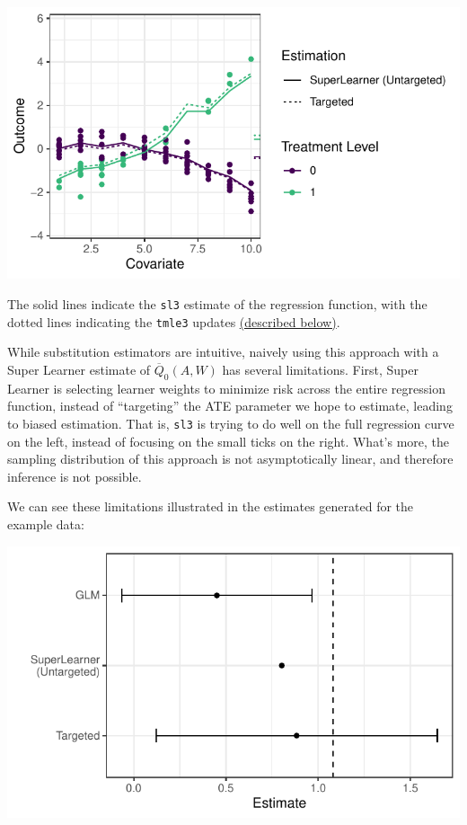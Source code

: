 \documentclass[12pt, krantz2,]{krantz}
\newcommand{\passthrough}[1]{#1}
\theoremstyle{definition}
\theoremstyle{definition}
\theoremstyle{definition}
\newcommand{\1}{\mathbbm{1}}
\begin{document}
\begin{center}\includegraphics[width=0.8\linewidth]{img/misc/tmle_sim/schematic_2b_sllik} \end{center}

The solid lines indicate the \passthrough{\lstinline!sl3!} estimate of the regression function, with the
dotted lines indicating the \passthrough{\lstinline!tmle3!} updates \protect\hyperlink{tmle-updates}{(described below)}.

While substitution estimators are intuitive, naively using this approach with a
Super Learner estimate of \(\overline{Q}_0(A,W)\) has several limitations. First,
Super Learner is selecting learner weights to minimize risk across the entire
regression function, instead of ``targeting'' the ATE parameter we hope to
estimate, leading to biased estimation. That is, \passthrough{\lstinline!sl3!} is trying to do well on
the full regression curve on the left, instead of focusing on the small ticks on
the right. What's more, the sampling distribution of this approach is not
asymptotically linear, and therefore inference is not possible.

We can see these limitations illustrated in the estimates generated for the
example data:

\begin{center}\includegraphics[width=0.8\linewidth]{img/misc/tmle_sim/schematic_3_effects} \end{center}
\end{document}
